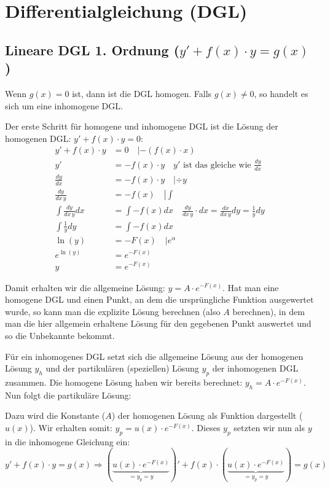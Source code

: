 \section{Differentialgleichung (DGL)}
\subsection{Lineare DGL 1. Ordnung ($y' + f(x) \cdot y = g(x)$)}
Wenn $g(x) = 0$ ist, dann ist die DGL homogen. Falls $g(x) \neq 0$, so handelt
es sich um eine inhomogene DGL.

Der erste Schritt für homogene und inhomogene DGL ist die Lösung der homogenen
DGL: $y' + f(x) \cdot y = 0$:
{\small
\begin{align*}
y' + f(x) \cdot y &= 0 \quad \left | -(f(x) \cdot x) \right.\\
y' &= -f(x) \cdot y \quad \boxed{y' \text{ ist das gleiche wie } \frac{dy}{dx}}\\
\frac{dy}{dx} &= -f(x) \cdot y \quad \left | \div y \right.\\
\frac{dy}{dx\, y} &= -f(x) \quad \left | \int \right.\\
\int \frac{dy}{dx\, y} dx &= \int -f(x) dx \quad \boxed{\frac{dy}{dx\, y} \cdot dx = \frac{dx}{dx\, y} dy = \frac{1}{y} dy}\\
\int \frac{1}{y} dy &= \int -f(x) dx\\
\ln(y) &= -F(x) \quad \left | e^\alpha \right.\\
e^{\ln(y)} &= e^{-F(x)}\\
y &= e^{-F(x)}
\end{align*}
}

Damit erhalten wir die allgemeine Lösung: $y = A \cdot e^{-F(x)}$. Hat man eine
homogene DGL und einen Punkt, an dem die ursprüngliche Funktion ausgewertet wurde,
so kann man die explizite Lösung berechnen (also $A$ berechnen), in dem man die
hier allgemein erhaltene Lösung für den gegebenen Punkt auswertet und so die
Unbekannte bekommt.

Für ein inhomogenes DGL setzt sich die allgemeine Lösung aus der homogenen Lösung
$y_h$ und der partikulären (speziellen) Lösung $y_p$ der inhomogenen DGL zusammen.
Die homogene Lösung haben wir bereits berechnet: $y_h = A \cdot e^{-F(x)}$. Nun
folgt die partikuläre Lösung:

Dazu wird die Konstante ($A$) der homogenen Lösung als Funktion dargestellt ($u(x)$).
Wir erhalten somit: $y_p = u(x) \cdot e^{-F(x)}$.
Dieses $y_p$ setzten wir nun als $y$ in die inhomogene Gleichung ein:
{\small
\[
y' + f(x) \cdot y = g(x) \Rightarrow (\underbrace{u(x) \cdot e^{-F(x)}}_{= y_p = y})'
+ f(x) \cdot (\underbrace{u(x) \cdot e^{-F(x)}}_{= y_p = y}) = g(x)
\]
}

